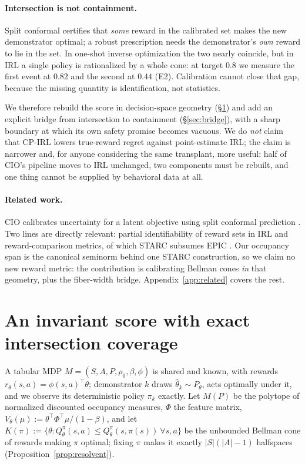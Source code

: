 \documentclass{article}
\newcommand{\method}{CP-IRL}
\begin{document}
\paragraph{Intersection is not containment.} Split conformal certifies that
\emph{some} reward in the calibrated set makes the new demonstrator optimal; a
robust prescription needs the demonstrator's \emph{own} reward to lie in the
set. In one-shot inverse optimization the two nearly coincide, but in IRL a
single policy is rationalized by a whole cone: at target $0.8$ we measure the
first event at $0.82$ and the second at $0.44$ (E2). Calibration cannot close
that gap, because the missing quantity is identification, not statistics.

We therefore rebuild the score in decision-space geometry
(\S\ref{sec:method}) and add an explicit bridge from intersection to containment
(\S\ref{sec:bridge}), with a sharp boundary at which its own safety promise
becomes vacuous. We do \emph{not} claim that \method{} lowers true-reward regret
against point-estimate IRL; the claim is narrower and, for anyone considering
the same transplant, more useful: half of CIO's pipeline moves to IRL unchanged,
two components must be rebuilt, and one thing cannot be supplied by behavioral
data at all.

\paragraph{Related work.} CIO calibrates uncertainty for a latent objective
\citep{lin2024conformal} using split conformal prediction
\citep{vovk2005algorithmic}. Two lines are directly relevant: partial
identifiability of reward sets in IRL \citep{skalse2023invariance,
kim2024unified} and reward-comparison metrics, of which STARC
\citep{skalse2024starc} subsumes EPIC \citep{gleave2021epic}. Our occupancy span
is the canonical seminorm behind one STARC construction, so we claim no new
reward metric: the contribution is calibrating Bellman cones \emph{in} that
geometry, plus the fiber-width bridge. Appendix~\ref{app:related} covers the
rest.

\section{An invariant score with exact intersection coverage}
\label{sec:method}

A tabular MDP $M=(S,A,P,\rho_0,\beta,\phi)$ is shared and known, with rewards
$r_\theta(s,a)=\phi(s,a)^\top\theta$; demonstrator $k$ draws
$\hat\theta_k\sim P_\theta$, acts optimally under it, and we observe its
deterministic policy $\pi_k$ exactly. Let $M(P)$ be the polytope of normalized
discounted occupancy measures, $\Phi$ the feature matrix,
$V_\theta(\mu):=\theta^\top\Phi^\top\mu/(1-\beta)$, and let $K(\pi):=\{\theta:
Q^\pi_\theta(s,a)\le Q^\pi_\theta(s,\pi(s))\ \forall s,a\}$ be the unbounded
Bellman cone of rewards making $\pi$ optimal; fixing $\pi$ makes it exactly
$|S|(|A|-1)$ halfspaces (Proposition~\ref{prop:resolvent}).
\end{document}
